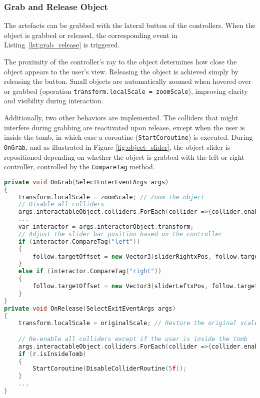 \subsubsection{Grab and Release Object}
\label{sec:object_interaction}

The artefacts can be grabbed with the lateral button of the controllers.
When the object is grabbed or released, the corresponding event in Listing~\ref{lst:grab_release} is triggered.  

The proximity of the controller's ray to the object determines how close the object appears to the user's view. 
Releasing the object is achieved simply by releasing the button.  
Small objects are automatically zoomed when hovered over or grabbed (operation \texttt{transform.localScale = zoomScale}), improving clarity and visibility during interaction.

Additionally, two other behaviors are implemented. 
The colliders that might interfere during grabbing are reactivated upon release, except when the user is inside the tomb, in which case a coroutine (\texttt{StartCoroutine}) is executed.
During \texttt{OnGrab}, and as illustrated in Figure \ref{fig:object_slider}, the object slider is repositioned depending on whether the object is grabbed with the left or right controller, controlled by the \texttt{CompareTag} method.

\begin{lstlisting}[language=C++, caption={Partial Fragment of objects onGrab and onRelease events.}, label={lst:grab_release},float]
private void OnGrab(SelectEnterEventArgs args)
{
    transform.localScale = zoomScale; // Zoom the object 
    // Disable all colliders 
    args.interactableObject.colliders.ForEach(collider =>{collider.enabled = false;});
    ...
    var interactor = args.interactorObject.transform;
    // Adjust the slider bar position based on the controller
    if (interactor.CompareTag("left")) 
    {
        follow.targetOffset = new Vector3(sliderRightxPos, follow.targetOffset.y, follow.targetOffset.z);
    }
    else if (interactor.CompareTag("right")) 
    {
        follow.targetOffset = new Vector3(sliderLeftxPos, follow.targetOffset.y, follow.targetOffset.z);
    }
}
private void OnRelease(SelectExitEventArgs args)
{
    transform.localScale = originalScale; // Restore the original scale

    // Re-enable all colliders except if the user is inside the tomb
    args.interactableObject.colliders.ForEach(collider =>{collider.enabled = true;});
    if (r.isInsideTomb) 
    {
        StartCoroutine(DisableColliderRoutine(5f));
    }
    ...
}
\end{lstlisting}


